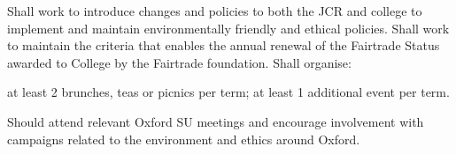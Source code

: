 Shall work to introduce changes and policies to both the JCR and college to implement and maintain environmentally friendly and ethical policies.
Shall work to maintain the criteria that enables the annual renewal of the Fairtrade Status awarded to College by the Fairtrade foundation.
Shall organise:\begin{enumerate}
at least 2 brunches, teas or picnics per term;
at least 1 additional event per term.\end{enumerate}
Should attend relevant Oxford SU meetings and encourage involvement with campaigns related to the environment and ethics around Oxford.
